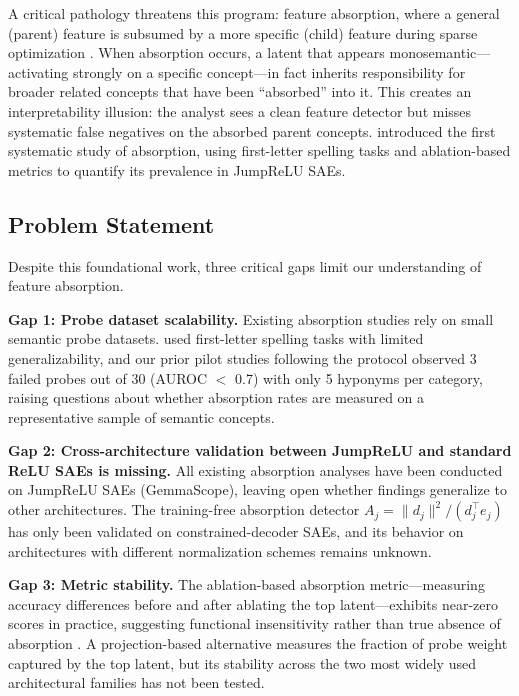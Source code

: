 \documentclass{article}
\begin{document}
A critical pathology threatens this program: feature absorption, where a general (parent) feature is subsumed by a more specific (child) feature during sparse optimization \citep{chanin2024feature}. When absorption occurs, a latent that appears monosemantic---activating strongly on a specific concept---in fact inherits responsibility for broader related concepts that have been ``absorbed'' into it. This creates an interpretability illusion: the analyst sees a clean feature detector but misses systematic false negatives on the absorbed parent concepts. \citet{chanin2024feature} introduced the first systematic study of absorption, using first-letter spelling tasks and ablation-based metrics to quantify its prevalence in JumpReLU SAEs.

\subsection{Problem Statement}

Despite this foundational work, three critical gaps limit our understanding of feature absorption.

\textbf{Gap 1: Probe dataset scalability.} Existing absorption studies rely on small semantic probe datasets. \citet{chanin2024feature} used first-letter spelling tasks with limited generalizability, and our prior pilot studies following the \citet{chanin2024feature} protocol observed 3 failed probes out of 30 (AUROC $<$ 0.7) with only 5 hyponyms per category, raising questions about whether absorption rates are measured on a representative sample of semantic concepts.

\textbf{Gap 2: Cross-architecture validation between JumpReLU and standard ReLU SAEs is missing.} All existing absorption analyses have been conducted on JumpReLU SAEs (GemmaScope), leaving open whether findings generalize to other architectures. The training-free absorption detector $A_j = \|d_j\|^2 / (d_j^\top e_j)$ \citep{chanin2024feature} has only been validated on constrained-decoder SAEs, and its behavior on architectures with different normalization schemes remains unknown.

\textbf{Gap 3: Metric stability.} The ablation-based absorption metric---measuring accuracy differences before and after ablating the top latent---exhibits near-zero scores in practice, suggesting functional insensitivity rather than true absence of absorption \citep{chanin2024feature}. A projection-based alternative measures the fraction of probe weight captured by the top latent, but its stability across the two most widely used architectural families has not been tested.
\end{document}

